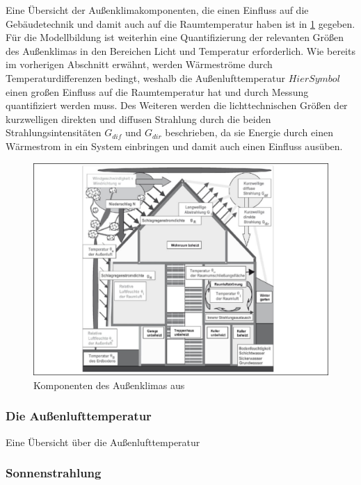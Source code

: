 Eine Übersicht der Außenklimakomponenten, die einen Einfluss auf die Gebäudetechnik und damit auch auf die Raumtemperatur haben ist in \ref{fig:aussenklima} gegeben. Für die Modellbildung ist weiterhin eine Quantifizierung der relevanten Größen des Außenklimas in den Bereichen Licht und Temperatur erforderlich. Wie bereits im vorherigen Abschnitt erwähnt, werden Wärmeströme durch Temperaturdifferenzen bedingt, weshalb die Außenlufttemperatur $Hier Symbol$ einen großen Einfluss auf die Raumtemperatur hat und durch Messung quantifiziert werden muss. Des Weiteren werden die lichttechnischen Größen der kurzwelligen direkten und diffusen Strahlung durch die beiden Strahlungsintensitäten $G_{dif}$ und $G_{dir}$ beschrieben, da sie Energie durch einen Wärmestrom in ein System einbringen und damit auch einen Einfluss ausüben.

\begin{figure}
\centering
\includegraphics[width=\textwidth]{abbildungen/20160322_aussenklima}
\caption[Komponenten des Außenklimas]{Komponenten des Außenklimas aus \cite[S.~298]{ha13}}
\label{fig:aussenklima}
\end{figure}

\subsubsection{Die Außenlufttemperatur}
Eine Übersicht über die Außenlufttemperatur  


\subsubsection{Sonnenstrahlung}
\label{sub:sonne}

